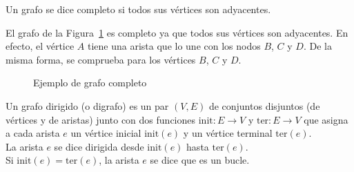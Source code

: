 \begin{defi}\label{def:completo}
	Un grafo se dice completo si todos sus vértices son adyacentes.
\end{defi}

\begin{ejemplo}
	El grafo de la Figura~\ref{fig:grafo_completo} es completo ya que todos sus vértices son adyacentes. En efecto, el vértice $A$ tiene una arista que lo une con los nodos $B$, $C$ y $D$. De la misma forma, se comprueba para los vértices $B$, $C$ y $D$.
	
	\begin{figure}[htb]
		\centering
		\ejemplografocompleto
		\caption{Ejemplo de grafo completo}
		\label{fig:grafo_completo}
	\end{figure}
	
\end{ejemplo}

\begin{defi}
	Un grafo dirigido (o digrafo) es un par $(V,E)$ de conjuntos disjuntos (de vértices y de aristas) junto con dos funciones $\mathrm{init} : E \to V$ y $\mathrm{ter} : E \to V$ que asigna a cada arista $e$ un vértice inicial $\mathrm{init}(e)$ y un vértice terminal $\mathrm{ter}(e)$.\\
	
	La arista $e$ se dice dirigida desde $\mathrm{init}(e)$ hasta $\mathrm{ter}(e)$.\\
	
	Si $\mathrm{init}(e) = \mathrm{ter}(e)$, la arista $e$ se dice que es un bucle.
\end{defi}

